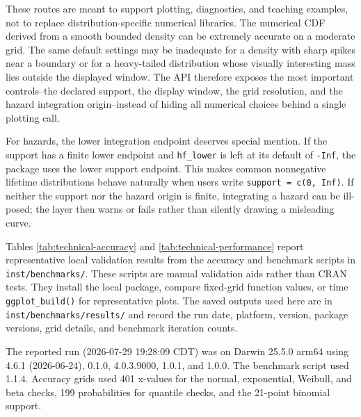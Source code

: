 These routes are meant to support plotting, diagnostics, and teaching examples,
not to replace distribution-specific numerical libraries. The numerical CDF
derived from a smooth bounded density can be extremely accurate on a moderate
grid. The same default settings may be inadequate for a density with sharp
spikes near a boundary or for a heavy-tailed distribution whose visually
interesting mass lies outside the displayed window. The API therefore exposes
the most important controls--the declared support, the display window, the grid
resolution, and the hazard integration origin--instead of hiding all numerical
choices behind a single plotting call.

For hazards, the lower integration endpoint deserves special mention. If the
support has a finite lower endpoint and \texttt{hf\_lower} is left at its default of
\texttt{-Inf}, the package uses the lower support endpoint. This makes common
nonnegative lifetime distributions behave naturally when users write
\texttt{support\ =\ c(0,\ Inf)}. If neither the support nor the hazard origin is finite,
integrating a hazard can be ill-posed; the layer then warns or fails rather
than silently drawing a misleading curve.

Tables \ref{tab:technical-accuracy} and \ref{tab:technical-performance}
report representative local validation results from the accuracy and benchmark
scripts in \texttt{inst/benchmarks/}. These scripts are manual validation
aids rather than CRAN tests. They install the local package, compare fixed-grid
function values, or time \texttt{ggplot\_build()} for representative plots. The saved
outputs used here are in \texttt{inst/benchmarks/results/} and record the run date,
platform,  version, package versions, grid details, and benchmark
iteration counts.

The reported run (2026-07-29 19:28:09 CDT) was on
Darwin 25.5.0 arm64 using
 4.6.1 (2026-06-24),
 0.1.0,
 4.0.3.9000,
 1.0.1, and
 1.0.0. The benchmark
script used  \citep{bench} 1.1.4. Accuracy
grids used 401 x-values for the normal, exponential, Weibull, and beta checks,
199 probabilities for quantile checks, and the 21-point binomial support.

